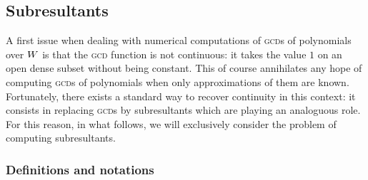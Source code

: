 \documentclass{article}
\begin{document}
\subsection{Subresultants}
\label{subsec:subres}

A first issue when dealing with numerical computations of \textsc{gcd}s 
of polynomials over $W$ is that the \textsc{gcd} function is not 
continuous: it takes the value $1$ on an open dense subset without being 
constant. This of course annihilates any hope of computing \textsc{gcd}s 
of polynomials when only approximations of them are known. Fortunately, 
there exists a standard way to recover continuity in this context: it 
consists in replacing \textsc{gcd}s by subresultants which 
are playing an analoguous role. For this reason, in what follows, we will 
exclusively consider the problem of computing subresultants.

\subsubsection*{Definitions and notations}
\end{document}
